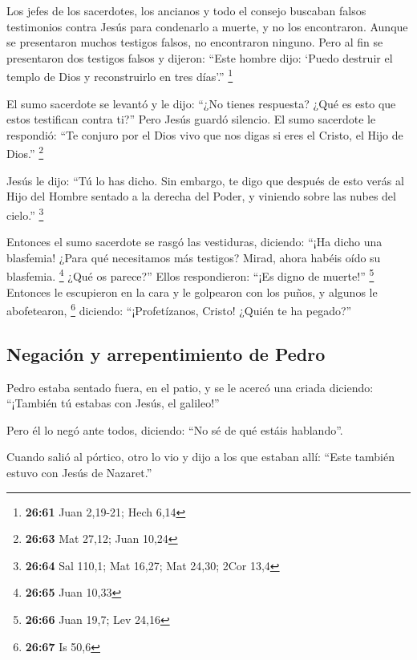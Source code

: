  Los jefes de los sacerdotes, los ancianos y todo el
consejo buscaban falsos testimonios contra Jesús para condenarlo a
muerte,  y no los encontraron. Aunque se presentaron
muchos testigos falsos, no encontraron ninguno. Pero al fin se
presentaron dos testigos falsos  y dijeron: ``Este hombre
dijo: `Puedo destruir el templo de Dios y reconstruirlo en tres días'.''
\footnote{\textbf{26:61} Juan 2,19-21; Hech 6,14}

 El sumo sacerdote se levantó y le dijo: ``¿No tienes
respuesta? ¿Qué es esto que estos testifican contra ti?''
 Pero Jesús guardó silencio. El sumo sacerdote le
respondió: ``Te conjuro por el Dios vivo que nos digas si eres el
Cristo, el Hijo de Dios.'' \footnote{\textbf{26:63} Mat 27,12; Juan
  10,24}

 Jesús le dijo: ``Tú lo has dicho. Sin embargo, te digo
que después de esto verás al Hijo del Hombre sentado a la derecha del
Poder, y viniendo sobre las nubes del cielo.'' \footnote{\textbf{26:64}
  Sal 110,1; Mat 16,27; Mat 24,30; 2Cor 13,4}

 Entonces el sumo sacerdote se rasgó las vestiduras,
diciendo: ``¡Ha dicho una blasfemia! ¿Para qué necesitamos más testigos?
Mirad, ahora habéis oído su blasfemia. \footnote{\textbf{26:65} Juan
  10,33}  ¿Qué os parece?'' Ellos respondieron: ``¡Es
digno de muerte!'' \footnote{\textbf{26:66} Juan 19,7; Lev 24,16}
 Entonces le escupieron en la cara y le golpearon con los
puños, y algunos le abofetearon, \footnote{\textbf{26:67} Is 50,6}
 diciendo: ``¡Profetízanos, Cristo! ¿Quién te ha
pegado?''

\hypertarget{negaciuxf3n-y-arrepentimiento-de-pedro}{%
\subsection{Negación y arrepentimiento de
Pedro}\label{negaciuxf3n-y-arrepentimiento-de-pedro}}

 Pedro estaba sentado fuera, en el patio, y se le acercó
una criada diciendo: ``¡También tú estabas con Jesús, el galileo!''

 Pero él lo negó ante todos, diciendo: ``No sé de qué
estáis hablando''.

 Cuando salió al pórtico, otro lo vio y dijo a los que
estaban allí: ``Este también estuvo con Jesús de Nazaret.''

